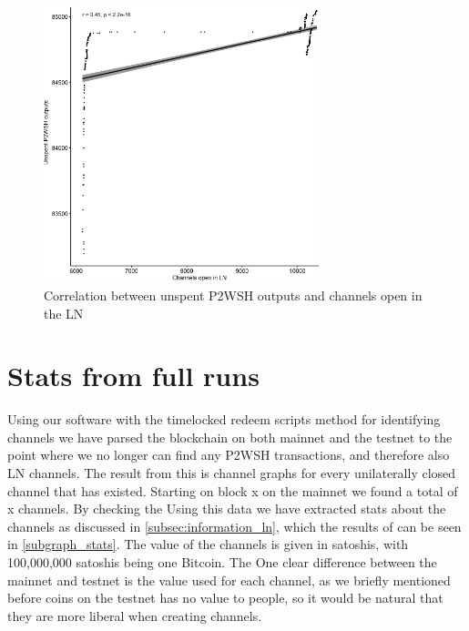 \begin{figure}[ht]
    \centering
    \includegraphics[width=8cm]{figures/graphs/channel_p2wsh_correlation_testnet.png}
    \caption{Correlation between unspent P2WSH outputs and channels open in the LN}
    \label{fig:correlation_testnet}
\end{figure}


\section{Stats from full runs}

Using our software with the timelocked redeem scripts method for identifying channels we have parsed the blockchain on both mainnet and the testnet to the point where we no longer can find any P2WSH transactions, and therefore also LN channels.
The result from this is channel graphs for every unilaterally closed channel that has existed. Starting on block x on the mainnet we found a total of x channels. By checking the 
Using this data we have extracted stats about the channels as discussed in \cref{subsec:information_ln}, which the results of can be seen in \cref{subgraph_stats}.
The value of the channels is given in satoshis, with 100,000,000 satoshis being one Bitcoin.
The One clear difference between the mainnet and testnet is the value used for each channel, as we briefly mentioned before coins on the testnet has no value to people, so it would be natural that they are more liberal when creating channels. 
\\

